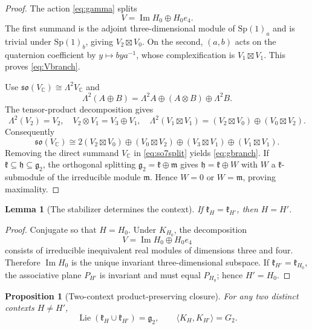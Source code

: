 \documentclass[11pt,a4paper]{article}
\newtheorem{proposition}[proposition]{Proposition}
\newtheorem{lemma}[lemma]{Lemma}
\newcommand{\CC}{\mathbb C}
\newcommand{\Sp}{\mathrm{Sp}}
\newcommand{\Lie}{\operatorname{Lie}}
\begin{document}
\begin{proof}
The action \eqref{eq:gamma} splits
\[
V=\operatorname{Im}H_0\oplus H_0e_4.
\]
The first summand is the adjoint three-dimensional module of $\Sp(1)_a$ and is trivial under $\Sp(1)_b$, giving $V_2\boxtimes V_0$.  On the second, $(a,b)$ acts on the quaternion coefficient by $y\mapsto bya^{-1}$, whose complexification is $V_1\boxtimes V_1$.  This proves \eqref{eq:Vbranch}.

Use $\mathfrak{so}(V_{\CC})\cong\Lambda^2V_{\CC}$ and
\[
\Lambda^2(A\oplus B)=\Lambda^2A\oplus(A\otimes B)\oplus\Lambda^2B.
\]
The tensor-product decomposition gives
\[
\Lambda^2(V_2)=V_2,
\quad
V_2\otimes V_1=V_3\oplus V_1,
\quad
\Lambda^2(V_1\boxtimes V_1)=(V_2\boxtimes V_0)\oplus(V_0\boxtimes V_2).
\]
Consequently
\[
\mathfrak{so}(V_{\CC})\cong
2(V_2\boxtimes V_0)\oplus(V_0\boxtimes V_2)
\oplus(V_3\boxtimes V_1)\oplus(V_1\boxtimes V_1).
\]
Removing the direct summand $V_{\CC}$ in \eqref{eq:so7split} yields \eqref{eq:gbranch}.  If $\mathfrak k\subseteq\mathfrak h\subseteq\mathfrak g_2$, the orthogonal splitting $\mathfrak g_2=\mathfrak k\oplus\mathfrak m$ gives $\mathfrak h=\mathfrak k\oplus W$ with $W$ a $\mathfrak k$-submodule of the irreducible module $\mathfrak m$.  Hence $W=0$ or $W=\mathfrak m$, proving maximality.
\end{proof}

\begin{lemma}[The stabilizer determines the context]
\label{lem:context-determined}
If $\mathfrak k_H=\mathfrak k_{H'}$, then $H=H'$.
\end{lemma}

\begin{proof}
Conjugate so that $H=H_0$.  Under $K_{H_0}$, the decomposition
\[
V=\operatorname{Im}H_0\oplus H_0e_4
\]
consists of irreducible inequivalent real modules of dimensions three and four.  Therefore $\operatorname{Im}H_0$ is the unique invariant three-dimensional subspace.  If $\mathfrak k_{H'}=\mathfrak k_{H_0}$, the associative plane $P_{H'}$ is invariant and must equal $P_{H_0}$; hence $H'=H_0$.
\end{proof}

\begin{proposition}[Two-context product-preserving closure]
\label{thm:two-context}
For any two distinct contexts $H\ne H'$,
\[
\Lie(\mathfrak k_H\cup\mathfrak k_{H'})=\mathfrak g_2,
\qquad
\langle K_H,K_{H'}\rangle=G_2.
\]
\end{proposition}
\end{document}
